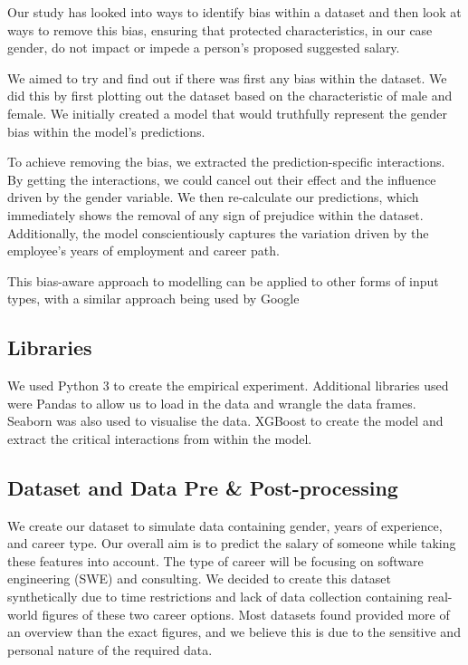 \documentclass{sigchi}
\begin{document}
	Our study has looked into ways to identify bias within a dataset and then look at ways to remove this bias, ensuring that protected characteristics, in our case gender, do not impact or impede a person's proposed suggested salary.  

	We aimed to try and find out if there was first any bias within the dataset. We did this by first plotting out the dataset based on the characteristic of male and female. We initially created a model that would truthfully represent the gender bias within the model's predictions.

	To achieve removing the bias, we extracted the prediction-specific interactions. By getting the interactions, we could cancel out their effect and the influence driven by the gender variable. We then re-calculate our predictions, which immediately shows the removal of any sign of prejudice within the dataset. Additionally, the model conscientiously captures the variation driven by the employee's years of employment and career path. 

	This bias-aware approach to modelling can be applied to other forms of input types, with a similar approach being used by Google \cite{google_ref}

\subsection{Libraries}
	We used Python 3 \cite{python} to create the empirical experiment. Additional libraries used were Pandas \cite{pandas} to allow us to load in the data and wrangle the data frames. Seaborn \cite{seaborn} was also used to visualise the data. XGBoost \cite{xgboost} to create the model and extract the critical interactions from within the model. 

\subsection{Dataset and Data Pre \& Post-processing}
	We create our dataset to simulate data containing gender, years of experience, and career type. Our overall aim is to predict the salary of someone while taking these features into account. The type of career will be focusing on software engineering (SWE) and consulting.  We decided to create this dataset synthetically due to time restrictions and lack of data collection containing real-world figures of these two career options. Most datasets found provided more of an overview than the exact figures, and we believe this is due to the sensitive and personal nature of the required data.
	
\end{document}
